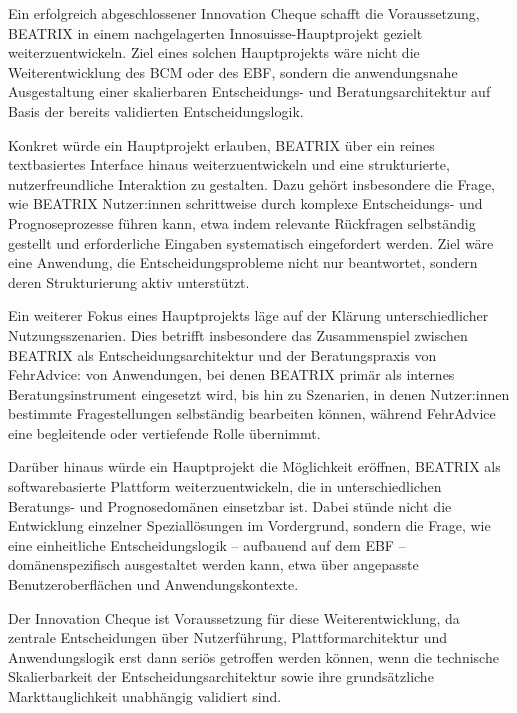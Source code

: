 \documentclass[11pt,a4paper]{article}
\begin{document}
Ein erfolgreich abgeschlossener Innovation Cheque schafft die Voraussetzung, BEATRIX in einem nachgelagerten Innosuisse-Hauptprojekt gezielt weiterzuentwickeln. Ziel eines solchen Hauptprojekts wäre nicht die Weiterentwicklung des BCM oder des EBF, sondern die anwendungsnahe Ausgestaltung einer skalierbaren Entscheidungs- und Beratungsarchitektur auf Basis der bereits validierten Entscheidungslogik.

Konkret würde ein Hauptprojekt erlauben, BEATRIX über ein reines textbasiertes Interface hinaus weiterzuentwickeln und eine strukturierte, nutzerfreundliche Interaktion zu gestalten. Dazu gehört insbesondere die Frage, wie BEATRIX Nutzer:innen schrittweise durch komplexe Entscheidungs- und Prognoseprozesse führen kann, etwa indem relevante Rückfragen selbständig gestellt und erforderliche Eingaben systematisch eingefordert werden. Ziel wäre eine Anwendung, die Entscheidungsprobleme nicht nur beantwortet, sondern deren Strukturierung aktiv unterstützt.

Ein weiterer Fokus eines Hauptprojekts läge auf der Klärung unterschiedlicher Nutzungsszenarien. Dies betrifft insbesondere das Zusammenspiel zwischen BEATRIX als Entscheidungsarchitektur und der Beratungspraxis von FehrAdvice: von Anwendungen, bei denen BEATRIX primär als internes Beratungsinstrument eingesetzt wird, bis hin zu Szenarien, in denen Nutzer:innen bestimmte Fragestellungen selbständig bearbeiten können, während FehrAdvice eine begleitende oder vertiefende Rolle übernimmt.

Darüber hinaus würde ein Hauptprojekt die Möglichkeit eröffnen, BEATRIX als softwarebasierte Plattform weiterzuentwickeln, die in unterschiedlichen Beratungs- und Prognosedomänen einsetzbar ist. Dabei stünde nicht die Entwicklung einzelner Speziallösungen im Vordergrund, sondern die Frage, wie eine einheitliche Entscheidungslogik -- aufbauend auf dem EBF -- domänenspezifisch ausgestaltet werden kann, etwa über angepasste Benutzeroberflächen und Anwendungskontexte.

Der Innovation Cheque ist Voraussetzung für diese Weiterentwicklung, da zentrale Entscheidungen über Nutzerführung, Plattformarchitektur und Anwendungslogik erst dann seriös getroffen werden können, wenn die technische Skalierbarkeit der Entscheidungsarchitektur sowie ihre grundsätzliche Markttauglichkeit unabhängig validiert sind.

\newpage

\end{document}
